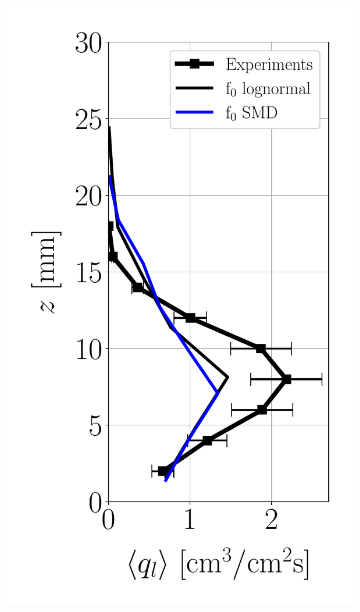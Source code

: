 \begin{figure}[ht]
\flushleft
\begin{subfigure}[b]{0.2\textwidth}
	\flushleft
   \includegraphics[scale=0.35]{./part2_developments/figures_ch6_lagrangian_JICF/params_f0/profiles/flux_along_z}
\end{subfigure}
\hspace*{0.5in}
\begin{subfigure}[b]{0.2\textwidth}
	\flushleft

\end{subfigure}
\end{figure}
